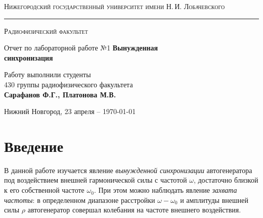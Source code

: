 \documentclass[a4paper,14pt]{extarticle}
\def\labauthors{Сарафанов Ф.Г., Платонова М.В.}
\def\labnumber{1}
\begin{document}
\begin{titlepage}
\begin{center}
{\small\textsc{Нижегородский государственный университет имени Н.\,И. Лобачевского}}
\vskip 2pt \hrule \vskip 3pt
{\small\textsc{Радиофизический факультет}}

\vfill


{{\large Отчет по лабораторной работе №\labnumber}\vskip 12pt {\Huge \bfseries Вынужденная \\[10pt] синхронизация}}

	
\vspace{2cm}
{\large Работу выполнили студенты \\[-0.25em] 430 группы радиофизического факультета \\[0.5em] {\Large \bfseries \labauthors}}



\end{center}

\vfill
	
	
	
\begin{center}
	{Нижний Новгород, 23 апреля -- \today}
\end{center}

\end{titlepage}
\tableofcontents
\newpage





\section*{Введение}

В данной работе изучается явление \textit{вынужденной синхронизации}  автогенератора под воздействием внешней гармонической силы с частотой $\omega$, достаточно близкой к его собственной частоте $\omega_0$. При этом можно наблюдать явление \textit{захвата частоты}: в определенном диапазоне расстройки $\omega-\omega_0$ и амплитуды внешней силы $\rho$ автогенератор совершал колебания на частоте внешнего воздействия.
\end{document}
